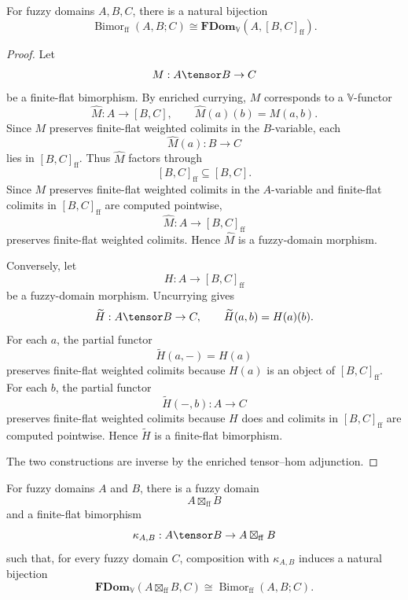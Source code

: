 \begin{proposition}
\label{prop:currying-bimorphisms-fdom}
For fuzzy domains \(A,B,C\), there is a natural bijection
\[
    \operatorname{Bimor}_{\mathrm{ff}}(A,B;C)
    \cong
    \mathbf{FDom}_{\mathbb V}(A,[B,C]_{\mathrm{ff}}).
\]
\end{proposition}

\begin{proof}
Let
\[
    M:A\tensor B\to C
\]
be a finite-flat bimorphism.  By enriched currying, \(M\) corresponds to a
\(\mathbb V\)-functor
\[
    \widehat M:A\to[B,C],
    \qquad
    \widehat M(a)(b)=M(a,b).
\]
Since \(M\) preserves finite-flat weighted colimits in the \(B\)-variable, each
\[
    \widehat M(a):B\to C
\]
lies in \([B,C]_{\mathrm{ff}}\).  Thus \(\widehat M\) factors through
\[
    [B,C]_{\mathrm{ff}}\subseteq[B,C].
\]
Since \(M\) preserves finite-flat weighted colimits in the \(A\)-variable and
finite-flat colimits in \([B,C]_{\mathrm{ff}}\) are computed pointwise,
\[
    \widehat M:A\to[B,C]_{\mathrm{ff}}
\]
preserves finite-flat weighted colimits.  Hence \(\widehat M\) is a
fuzzy-domain morphism.

Conversely, let
\[
    H:A\to[B,C]_{\mathrm{ff}}
\]
be a fuzzy-domain morphism.  Uncurrying gives
\[
    \widetilde H:A\tensor B\to C,
    \qquad
    \widetilde H(a,b)=H(a)(b).
\]
For each \(a\), the partial functor
\[
    \widetilde H(a,-)=H(a)
\]
preserves finite-flat weighted colimits because \(H(a)\) is an object of
\([B,C]_{\mathrm{ff}}\).  For each \(b\), the partial functor
\[
    \widetilde H(-,b):A\to C
\]
preserves finite-flat weighted colimits because \(H\) does and colimits in
\([B,C]_{\mathrm{ff}}\) are computed pointwise.  Hence \(\widetilde H\) is a
finite-flat bimorphism.

The two constructions are inverse by the enriched tensor--hom adjunction.
\end{proof}

\begin{theorem}
\label{thm:kelly-tensor-product-fdom}
For fuzzy domains \(A\) and \(B\), there is a fuzzy domain
\[
    A\boxtimes_{\mathrm{ff}}B
\]
and a finite-flat bimorphism
\[
    \kappa_{A,B}:A\tensor B\to A\boxtimes_{\mathrm{ff}}B
\]
such that, for every fuzzy domain \(C\), composition with \(\kappa_{A,B}\)
induces a natural bijection
\[
    \mathbf{FDom}_{\mathbb V}(A\boxtimes_{\mathrm{ff}}B,C)
    \cong
    \operatorname{Bimor}_{\mathrm{ff}}(A,B;C).
\]
\end{theorem}

